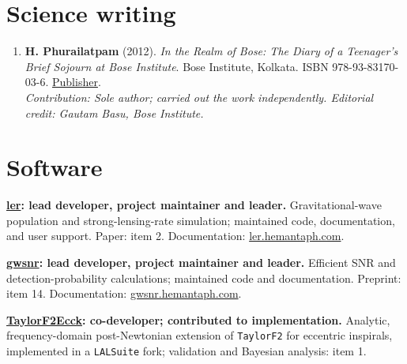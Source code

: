 \documentclass[11pt]{article}
\begin{document}
\section*{Science writing}
\begin{enumerate}[start=17]
\item \textbf{H. Phurailatpam} (2012). \textit{In the Realm of Bose: The Diary of a Teenager's Brief Sojourn at Bose Institute}. Bose Institute, Kolkata. ISBN 978-93-83170-03-6. \href{https://jcbose.ac.in/publication}{Publisher}.\\\emph{Contribution: Sole author; carried out the work independently. Editorial credit: Gautam Basu, Bose Institute.}
\end{enumerate}
\section*{Software}
\textbf{\href{https://ler.hemantaph.com/}{ler}: lead developer, project maintainer and leader.} Gravitational-wave population and strong-lensing-rate simulation; maintained code, documentation, and user support. Paper: item 2. Documentation: \href{https://ler.hemantaph.com/}{ler.hemantaph.com}.

\textbf{\href{https://gwsnr.hemantaph.com/}{gwsnr}: lead developer, project maintainer and leader.} Efficient SNR and detection-probability calculations; maintained code and documentation. Preprint: item 14. Documentation: \href{https://gwsnr.hemantaph.com/}{gwsnr.hemantaph.com}.

\textbf{\href{https://arxiv.org/abs/2508.12697}{TaylorF2Ecck}: co-developer; contributed to implementation.} Analytic, frequency-domain post-Newtonian extension of \texttt{TaylorF2} for eccentric inspirals, implemented in a \texttt{LALSuite} fork; validation and Bayesian analysis: item 1.
\end{document}
